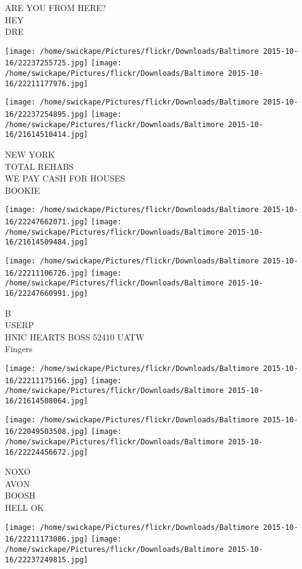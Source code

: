 \documentclass[10pt,letterpaper]{article}
\begin{document}
ARE YOU FROM HERE?\\
HEY\\
DRE
\pagebreak

\texttt{[image: /home/swickape/Pictures/flickr/Downloads/Baltimore 2015-10-16/22237255725.jpg]}
\texttt{[image: /home/swickape/Pictures/flickr/Downloads/Baltimore 2015-10-16/22211177976.jpg]}

\texttt{[image: /home/swickape/Pictures/flickr/Downloads/Baltimore 2015-10-16/22237254895.jpg]}
\texttt{[image: /home/swickape/Pictures/flickr/Downloads/Baltimore 2015-10-16/21614510414.jpg]}

NEW YORK\\
TOTAL REHABS\\
WE PAY CASH FOR HOUSES\\
BOOKIE
\pagebreak

\texttt{[image: /home/swickape/Pictures/flickr/Downloads/Baltimore 2015-10-16/22247662071.jpg]}
\texttt{[image: /home/swickape/Pictures/flickr/Downloads/Baltimore 2015-10-16/21614509484.jpg]}

\texttt{[image: /home/swickape/Pictures/flickr/Downloads/Baltimore 2015-10-16/22211106726.jpg]}
\texttt{[image: /home/swickape/Pictures/flickr/Downloads/Baltimore 2015-10-16/22247660991.jpg]}

B\\
USERP\\
HNIC HEARTS BOSS 52410 UATW\\
Fingers
\pagebreak

\texttt{[image: /home/swickape/Pictures/flickr/Downloads/Baltimore 2015-10-16/22211175166.jpg]}
\texttt{[image: /home/swickape/Pictures/flickr/Downloads/Baltimore 2015-10-16/21614508064.jpg]}

\texttt{[image: /home/swickape/Pictures/flickr/Downloads/Baltimore 2015-10-16/22049503508.jpg]}
\texttt{[image: /home/swickape/Pictures/flickr/Downloads/Baltimore 2015-10-16/22224456672.jpg]}

NOXO\\
AVON\\
BOOSH\\
HELL OK
\pagebreak

\texttt{[image: /home/swickape/Pictures/flickr/Downloads/Baltimore 2015-10-16/22211173086.jpg]}
\texttt{[image: /home/swickape/Pictures/flickr/Downloads/Baltimore 2015-10-16/22237249815.jpg]}
\end{document}
